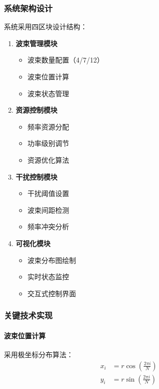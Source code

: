 \documentclass[12pt]{article}
\begin{document}
\subsubsection{系统架构设计}
系统采用四区块设计结构：
\begin{enumerate}
    \item \textbf{波束管理模块}
    \begin{itemize}
        \item 波束数量配置（4/7/12）
        \item 波束位置计算
        \item 波束状态管理
    \end{itemize}
    
    \item \textbf{资源控制模块}
    \begin{itemize}
        \item 频率资源分配
        \item 功率级别调节
        \item 资源优化算法
    \end{itemize}
    
    \item \textbf{干扰控制模块}
    \begin{itemize}
        \item 干扰阈值设置
        \item 波束间距检测
        \item 频率冲突分析
    \end{itemize}

    \item \textbf{可视化模块}
    \begin{itemize}
        \item 波束分布图绘制
        \item 实时状态监控
        \item 交互式控制界面
    \end{itemize}
\end{enumerate}

\subsubsection{关键技术实现}
\paragraph{波束位置计算}
采用极坐标分布算法：
\begin{equation}
\begin{split}
x_i &= r \cos(\frac{2\pi i}{N}) \\
y_i &= r \sin(\frac{2\pi i}{N})
\end{split}
\end{equation}
\end{document}
